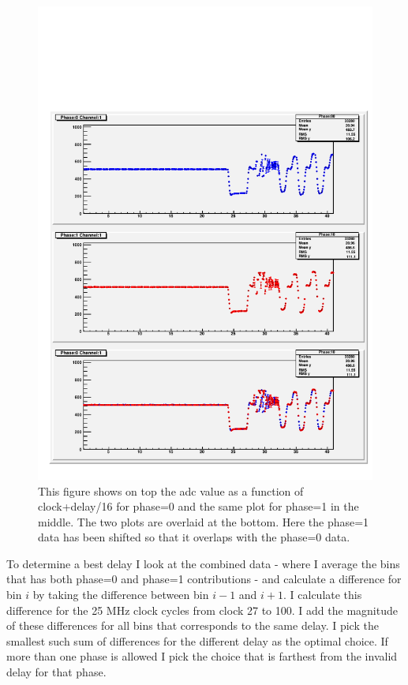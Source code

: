 \begin{figure}
\begin{center}
\includegraphics[width=\linewidth]{phaseAndDelayPlot_channe_1_1}
\end{center}
\caption{This figure shows on top the adc value as a function of clock+delay/16 for phase=0 and the same plot for phase=1 in the middle. The two plots are overlaid at the bottom. Here the phase=1 data has been shifted so that it overlaps with the phase=0 data.}
\label{fig:phasedelayfinal}
\end{figure}

To determine a best delay I look at the combined data - where I average the bins that has both phase=0 and phase=1 contributions - and calculate a difference for bin $i$ by taking the difference between bin $i-1$  and $i+1$. I calculate this difference for the 25 MHz clock cycles from clock 27 to 100. I add the magnitude of these differences for all bins that corresponds to the same delay. I pick the smallest such sum of differences for the different delay as the optimal choice. If more than one phase is allowed I pick the choice that is farthest from the invalid delay for that phase.


